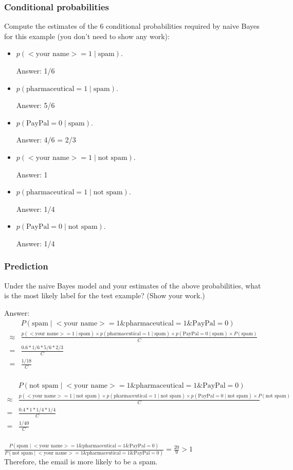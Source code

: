 \documentclass{article}
\def\ans#1{\par\gre{Answer: #1}}
\def\blu#1{{\color{blu}#1}}
\def\gre#1{{\color{gre}#1}}
\def\cond{\; | \;}
\def\items#1{\begin{itemize}#1\end{itemize}}
\begin{document}
\subsubsection{Conditional probabilities}

\blu{Compute the estimates of the 6 conditional probabilities required by naive Bayes for this example}  (you don't need to show any work):
\items{
\item $p(\text{$<$your name$>$} = 1  \cond \text{spam})$. \ans{1/6}
\item $p(\text{pharmaceutical} = 1 \cond \text{spam})$. \ans{5/6}
\item $p(\text{PayPal} = 0  \cond \text{spam})$. \ans{4/6 = 2/3}
\item $p(\text{$<$your name$>$} = 1  \cond \text{not spam})$. \ans{1}
\item $p(\text{pharmaceutical} = 1  \cond \text{not spam})$. \ans{1/4}
\item $p(\text{PayPal} = 0  \cond \text{not spam})$. \ans{1/4}
}

\subsubsection{Prediction}


\blu{Under the naive Bayes model and your estimates of the above probabilities, what is the most likely label for the test example? (Show your work.)}
\ans{\begin{align*} 
    &P(\text{spam} \cond \text{$<$your name$>$} = 1 \& \text{pharmaceutical} = 1 \& \text{PayPal} = 0 ) 
    \\ \approx & \frac{p(\text{$<$your name$>$} = 1  \cond \text{spam}) \times p(\text{pharmaceutical} = 1 \cond \text{spam}) \times p(\text{PayPal} = 0  \cond \text{spam}) \times P(\text{spam})}{C}
    \\ = & \frac{0.6*1/6*5/6*2/3}{C} \\
    =& \frac{1/18}{C}
\end{align*}\\
\begin{align*} 
    &P(\text{not spam} \cond \text{$<$your name$>$} = 1 \& \text{pharmaceutical} = 1 \& \text{PayPal} = 0 ) 
    \\ \approx & \frac{p(\text{$<$your name$>$} = 1  \cond \text{not spam}) \times p(\text{pharmaceutical} = 1 \cond \text{not spam}) \times p(\text{PayPal} = 0  \cond \text{not spam}) \times P(\text{not spam})}{C}
    \\ = & \frac{0.4*1*1/4*1/4}{C} \\
    =& \frac{1/40}{C}
\end{align*}
\\
$ \frac{ P(\text{spam} \cond \text{$<$your name$>$} = 1 \& \text{pharmaceutical} = 1 \& \text{PayPal} = 0 )}{P(\text{not spam} \cond \text{$<$your name$>$} = 1 \& \text{pharmaceutical} = 1 \& \text{PayPal} = 0 )} = \frac{20}{9} > 1$
\\Therefore, the email is more likely to be a spam.}
\end{document}
